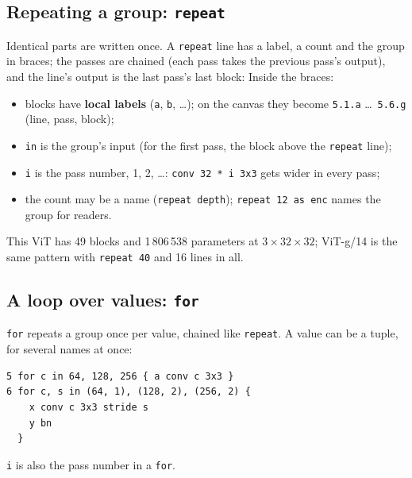 \subsection{Repeating a group: \texttt{repeat}}
Identical parts are written once. A \texttt{repeat} line has a label, a count and the group in braces; the passes are chained (each
pass takes the previous pass's output), and the line's output is the last pass's last block:
Inside the braces:
\begin{itemize}[nosep]
  \item blocks have \textbf{local labels} (\texttt{a}, \texttt{b}, \dots); on the canvas they become \texttt{5.1.a} \dots\
        \texttt{5.6.g} (line, pass, block);
  \item \texttt{in} is the group's input (for the first pass, the block above the \texttt{repeat} line);
  \item \texttt{i} is the pass number, 1, 2, \dots: \texttt{conv 32 * i 3x3} gets wider in every pass;
  \item the count may be a name (\texttt{repeat depth}); \texttt{repeat 12 as enc} names the group for readers.
\end{itemize}
This ViT has 49 blocks and 1\,806\,538 parameters at $3\times32\times32$; ViT-g/14 is the same pattern with \texttt{repeat 40} and
16 lines in all.

\subsection{A loop over values: \texttt{for}}
\texttt{for} repeats a group once per value, chained like \texttt{repeat}. A value can be a tuple, for several names at once:
\begin{verbatim}
5 for c in 64, 128, 256 { a conv c 3x3 }
6 for c, s in (64, 1), (128, 2), (256, 2) {
    x conv c 3x3 stride s
    y bn
  }
\end{verbatim}
\texttt{i} is also the pass number in a \texttt{for}.

